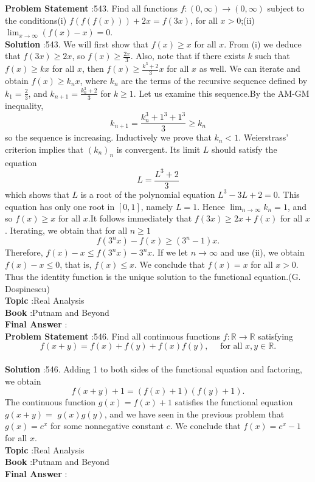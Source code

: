 \documentclass[10pt]{article}
\begin{document}
\textbf{Problem Statement} :543. Find all functions $f:(0, \infty) \rightarrow(0, \infty)$ subject to the conditions(i) $f(f(f(x)))+2 x=f(3 x)$, for all $x>0$;(ii) $\lim _{x \rightarrow \infty}(f(x)-x)=0$.\\
\textbf{Solution} :543. We will first show that $f(x) \geq x$ for all $x$. From (i) we deduce that $f(3 x) \geq 2 x$, so $f(x) \geq \frac{2 x}{3}$. Also, note that if there exists $k$ such that $f(x) \geq k x$ for all $x$, then $f(x) \geq \frac{k^{3}+2}{3} x$ for all $x$ as well. We can iterate and obtain $f(x) \geq k_{n} x$, where $k_{n}$ are the terms of the recursive sequence defined by $k_{1}=\frac{2}{3}$, and $k_{n+1}=\frac{k_{n}^{3}+2}{3}$ for $k \geq 1$. Let us examine this sequence.By the AM-GM inequality,$$ k_{n+1}=\frac{k_{n}^{3}+1^{3}+1^{3}}{3} \geq k_{n} $$so the sequence is increasing. Inductively we prove that $k_{n}<1$. Weierstrass' criterion implies that $\left(k_{n}\right)_{n}$ is convergent. Its limit $L$ should satisfy the equation$$ L=\frac{L^{3}+2}{3} $$which shows that $L$ is a root of the polynomial equation $L^{3}-3 L+2=0$. This equation has only one root in $[0,1]$, namely $L=1$. Hence $\lim _{n \rightarrow \infty} k_{n}=1$, and so $f(x) \geq x$ for all $x$.It follows immediately that $f(3 x) \geq 2 x+f(x)$ for all $x$. Iterating, we obtain that for all $n \geq 1$$$ f\left(3^{n} x\right)-f(x) \geq\left(3^{n}-1\right) x . $$Therefore, $f(x)-x \leq f\left(3^{n} x\right)-3^{n} x$. If we let $n \rightarrow \infty$ and use (ii), we obtain $f(x)-x \leq 0$, that is, $f(x) \leq x$. We conclude that $f(x)=x$ for all $x>0$. Thus the identity function is the unique solution to the functional equation.(G. Dospinescu) \\
\textbf{Topic} :Real Analysis\\
\textbf{Book} :Putnam and Beyond\\
\textbf{Final Answer} :\\


\textbf{Problem Statement} :546. Find all continuous functions $f: \mathbb{R} \rightarrow \mathbb{R}$ satisfying$$ f(x+y)=f(x)+f(y)+f(x) f(y), \quad \text { for all } x, y \in \mathbb{R} . $$\\
\textbf{Solution} :546. Adding 1 to both sides of the functional equation and factoring, we obtain$$ f(x+y)+1=(f(x)+1)(f(y)+1) . $$The continuous function $g(x)=f(x)+1$ satisfies the functional equation $g(x+y)=$ $g(x) g(y)$, and we have seen in the previous problem that $g(x)=c^{x}$ for some nonnegative constant $c$. We conclude that $f(x)=c^{x}-1$ for all $x$.\\
\textbf{Topic} :Real Analysis\\
\textbf{Book} :Putnam and Beyond\\
\textbf{Final Answer} :\\
\end{document}
